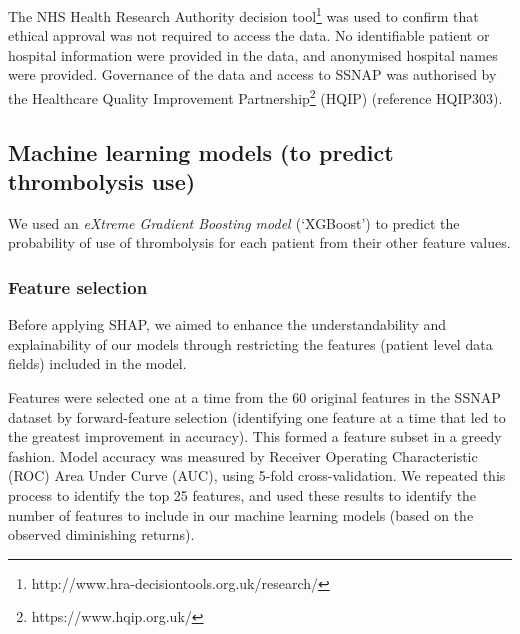 The NHS Health Research Authority decision tool\footnote{http://www.hra-decisiontools.org.uk/research/} was used to confirm that ethical approval was not required to access the data. No identifiable patient or hospital information were provided in the data, and anonymised hospital names were provided. Governance of the data and access to SSNAP was authorised by the Healthcare Quality Improvement Partnership\footnote{https://www.hqip.org.uk/} (HQIP) (reference HQIP303). 

\subsection{Machine learning models (to predict thrombolysis use)}
We used an \emph{eXtreme Gradient Boosting model \cite{chen_xgboost_2016}} (`XGBoost') to predict the probability of use of thrombolysis for each patient from their other feature values.

\subsubsection{Feature selection}
Before applying SHAP, we aimed to enhance the understandability and explainability of our models through restricting the features (patient level data fields) included in the model. 

Features were selected one at a time from the 60 original features in the SSNAP dataset by forward-feature selection \cite{ferri_comparative_1994} (identifying one feature at a time that led to the greatest improvement in accuracy). This formed a feature subset in a greedy fashion. Model accuracy was measured by Receiver Operating Characteristic (ROC) Area Under Curve (AUC), using 5-fold cross-validation. We repeated this process to identify the top 25 features, and used these results to identify the number of features to include in our machine learning models (based on the observed diminishing returns).


